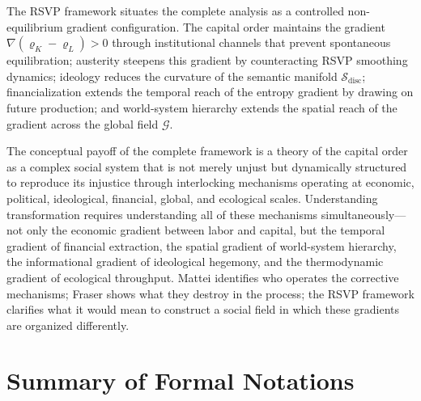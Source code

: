 \documentclass[12pt,a4paper]{article}
\theoremstyle{definition}
\theoremstyle{remark}
\begin{document}
The RSVP framework situates the complete analysis as a controlled non-equilibrium gradient configuration. The capital order maintains the gradient $\nabla(\varrho_K - \varrho_L) > 0$ through institutional channels that prevent spontaneous equilibration; austerity steepens this gradient by counteracting RSVP smoothing dynamics; ideology reduces the curvature of the semantic manifold $\mathcal{S}_{\text{disc}}$; financialization extends the temporal reach of the entropy gradient by drawing on future production; and world-system hierarchy extends the spatial reach of the gradient across the global field $\mathcal{G}$.

The conceptual payoff of the complete framework is a theory of the capital order as a complex social system that is not merely unjust but dynamically structured to reproduce its injustice through interlocking mechanisms operating at economic, political, ideological, financial, global, and ecological scales. Understanding transformation requires understanding all of these mechanisms simultaneously---not only the economic gradient between labor and capital, but the temporal gradient of financial extraction, the spatial gradient of world-system hierarchy, the informational gradient of ideological hegemony, and the thermodynamic gradient of ecological throughput. Mattei identifies who operates the corrective mechanisms; Fraser shows what they destroy in the process; the RSVP framework clarifies what it would mean to construct a social field in which these gradients are organized differently.

\appendix

\section{Summary of Formal Notations}
\label{app:notation}
\end{document}
